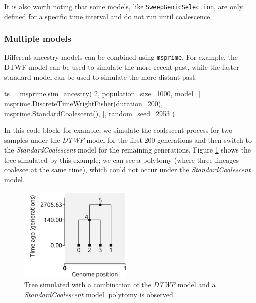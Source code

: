 \documentclass[graybox]{svmult}
\newcommand{\msprime}[0]{\texttt{msprime}}
\begin{document}
It is also worth noting that some models, like \texttt{SweepGenicSelection}, are only defined for a specific time interval and do not run until coalescence.

\subsubsection{Multiple models}\label{multiple-models}

Different ancestry models can be combined using \msprime. For example, the DTWF model can be used to simulate the more recent
past, while the faster standard model can be used to simulate the more distant past.

\begin{pythoncode}
ts = msprime.sim_ancestry(
    2,
    population_size=1000,
    model=[
        msprime.DiscreteTimeWrightFisher(duration=200),
        msprime.StandardCoalescent(),
    ],
    random_seed=2953
)
\end{pythoncode}

In this code block, for example, we simulate the coalescent process for two samples under the \emph{DTWF} model for the first 200 generations
and then switch to the \emph{StandardCoalescent} model for the remaining generations. Figure \ref{fig:polytomy} shows the tree
simulated by this example; we can see a polytomy (where three lineages coalesce at the same time), which could not occur under the
\emph{StandardCoalescent} model.

\begin{figure}
\begin{center}
\includegraphics[width=0.48\textwidth]{images/polytomy.pdf}
\end{center}
\caption{\label{fig:polytomy} Tree simulated with a combination of the \emph{DTWF} model and a \emph{StandardCoalescent} model. polytomy is observed.}
\end{figure}

\
\end{document}
